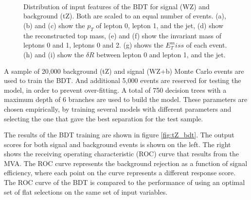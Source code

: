 \begin{figure}[h!]
\center
    \\
    \\
    \\                          
    
    \caption{Distribution of input features of the BDT for signal (WZ) and background (tZ). Both are scaled to an equal number of events. (a), (b) and (c) show the $p_T$ of lepton 0, lepton 1, and the jet, (d) show the reconstructed top mass, (e) and (f) show the invariant mass of leptons 0 and 1, leptons 0 and 2. (g) shows the $E_T^miss$ of each event. (h) and (i) show the $\delta R$ between lepton 0 and lepton 1, and the jet.}
    \label{fig:tZ_kinematics}
\end{figure}

A sample of 20,000 background (tZ) and signal (WZ+b) Monte Carlo events are used to train the BDT. And additional 5,000 events are reserved for testing the model, in order to prevent over-fitting. A total of 750 decision trees with a maximum depth of 6 branches are used to build the model. These parameters are chosen empirically, by training several models with different parameters and selecting the one that gave the best separation for the test sample. 

The results of the BDT training are shown in figure \ref{fig:tZ_bdt}. The output scores for both signal and background events is shown on the left. The right shows the receiving operating characteristic (ROC) curve that results from the MVA. The ROC curve represents the background rejection as a function of signal efficiency, where each point on the curve represents a different response score. The ROC curve of the BDT is compared to the performance of using an optimal set of flat selections on the same set of input variables.

